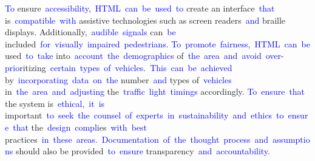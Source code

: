 \documentclass{article}
\begin{document}
\begin{tcolorbox}[colframe=black,colback=white]
\textcolor{blue}{To} ensure\textcolor{blue}{~accessibility},\textcolor{blue}{~HTML}\textcolor{blue}{~can}\textcolor{blue}{~be}\textcolor{blue}{~used}\textcolor{blue}{~to} create an interface\textcolor{blue}{~that} is\textcolor{blue}{~compatible}\textcolor{blue}{~with} assistive technologies such as screen readers\textcolor{blue}{~and} braille displays\textcolor{blue}{.} Additionally,\textcolor{blue}{~audible}\textcolor{blue}{~signals} can\textcolor{blue}{~be} included\textcolor{blue}{~for}\textcolor{blue}{~visually}\textcolor{blue}{~impaired}\textcolor{blue}{~pedestrians}\textcolor{blue}{.
}\textcolor{blue}{To}\textcolor{blue}{~promote}\textcolor{blue}{~fairness}\textcolor{blue}{,}\textcolor{blue}{~HTML}\textcolor{blue}{~can}\textcolor{blue}{~be} used\textcolor{blue}{~to}\textcolor{blue}{~take} into\textcolor{blue}{~account}\textcolor{blue}{~the}\textcolor{blue}{~demographics} of\textcolor{blue}{~the}\textcolor{blue}{~area}\textcolor{blue}{~and}\textcolor{blue}{~avoid}\textcolor{blue}{~over}\textcolor{blue}{-p}\textcolor{blue}{rior}itizing\textcolor{blue}{~certain}\textcolor{blue}{~types}\textcolor{blue}{~of}\textcolor{blue}{~vehicles}\textcolor{blue}{.}\textcolor{blue}{~This}\textcolor{blue}{~can}\textcolor{blue}{~be}\textcolor{blue}{~achieved} by\textcolor{blue}{~incorporating}\textcolor{blue}{~data}\textcolor{blue}{~on}\textcolor{blue}{~the} number\textcolor{blue}{~and} types of\textcolor{blue}{~vehicles} in\textcolor{blue}{~the}\textcolor{blue}{~area}\textcolor{blue}{~and}\textcolor{blue}{~adjusting} the\textcolor{blue}{~traffic}\textcolor{blue}{~light}\textcolor{blue}{~timings} accordingly\textcolor{blue}{.
}\textcolor{blue}{To}\textcolor{blue}{~ensure}\textcolor{blue}{~that} the system is\textcolor{blue}{~ethical},\textcolor{blue}{~it}\textcolor{blue}{~is} important\textcolor{blue}{~to}\textcolor{blue}{~seek}\textcolor{blue}{~the}\textcolor{blue}{~counsel}\textcolor{blue}{~of}\textcolor{blue}{~experts}\textcolor{blue}{~in}\textcolor{blue}{~sustainability}\textcolor{blue}{~and}\textcolor{blue}{~ethics}\textcolor{blue}{~to}\textcolor{blue}{~ensure}\textcolor{blue}{~that} the\textcolor{blue}{~design}\textcolor{blue}{~compl}ies\textcolor{blue}{~with}\textcolor{blue}{~best} practices\textcolor{blue}{~in}\textcolor{blue}{~these}\textcolor{blue}{~areas}\textcolor{blue}{.}\textcolor{blue}{~Documentation}\textcolor{blue}{~of}\textcolor{blue}{~the}\textcolor{blue}{~thought}\textcolor{blue}{~process}\textcolor{blue}{~and}\textcolor{blue}{~assumptions} should also be provided\textcolor{blue}{~to}\textcolor{blue}{~ensure} transparency\textcolor{blue}{~and}\textcolor{blue}{~accountability}.

\end{tcolorbox}
\end{document}
